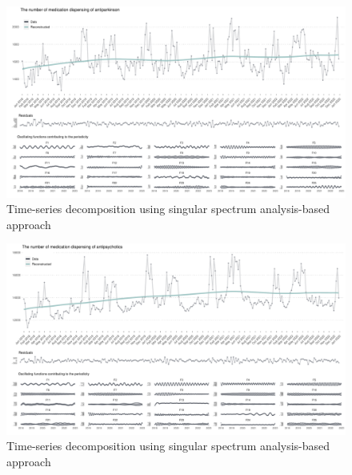 \documentclass[
  letterpaper,
  DIV=11,
  numbers=noendperiod]{scrartcl}
\begin{document}
\begin{figure}[H]

{\centering \includegraphics[width=1\linewidth,height=\textheight,keepaspectratio]{supplementary_files/figure-pdf/unnamed-chunk-2-13.pdf}

}

\caption{Time-series decomposition using singular spectrum
analysis-based approach}

\end{figure}%

\begin{figure}[H]

{\centering \includegraphics[width=1\linewidth,height=\textheight,keepaspectratio]{supplementary_files/figure-pdf/unnamed-chunk-2-14.pdf}

}

\caption{Time-series decomposition using singular spectrum
analysis-based approach}

\end{figure}%
\end{document}
